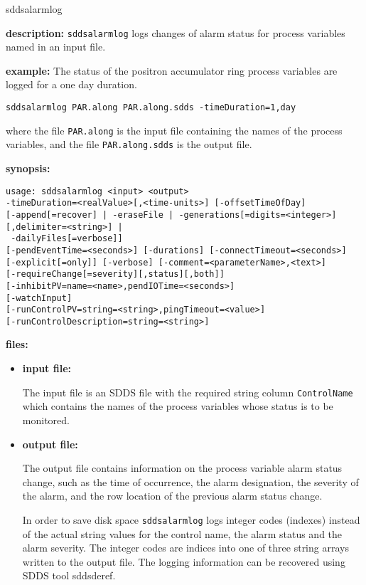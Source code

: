 \begin{sddsprog}{sddsalarmlog}
\item {\bf description:}
\verb+sddsalarmlog+ logs changes of alarm status for process variables named in an input file.
\item {\bf example:} 
% 
The status of the positron accumulator ring process variables are logged
for a one day duration.
\begin{verbatim}
sddsalarmlog PAR.along PAR.along.sdds -timeDuration=1,day
\end{verbatim}
where the file \verb+PAR.along+ is the input file containing the names of the
process variables, and the file \verb+PAR.along.sdds+ is the output file.

\item {\bf synopsis:} 
\begin{verbatim}
usage: sddsalarmlog <input> <output>
-timeDuration=<realValue>[,<time-units>] [-offsetTimeOfDay]
[-append[=recover] | -eraseFile | -generations[=digits=<integer>][,delimiter=<string>] |
 -dailyFiles[=verbose]]
[-pendEventTime=<seconds>] [-durations] [-connectTimeout=<seconds>]
[-explicit[=only]] [-verbose] [-comment=<parameterName>,<text>]
[-requireChange[=severity][,status][,both]]
[-inhibitPV=name=<name>,pendIOTime=<seconds>]
[-watchInput]
[-runControlPV=string=<string>,pingTimeout=<value>]
[-runControlDescription=string=<string>]
\end{verbatim}

\item {\bf files:}
\begin{itemize}
\item {\bf input file:}\par
The input file is an SDDS file with the required string column {\tt ControlName}
which contains the names of the process variables whose status is to be monitored.

\item {\bf output file:}\par
The output file contains information on the process variable alarm status
change, such as the time of occurrence, the alarm designation, the severity of the alarm, and the
row location of the previous alarm status change.

In order to save disk space {\tt sddsalarmlog} logs integer codes
(indexes) instead of the actual string values for the control name,
the alarm status and the alarm severity. The integer codes are indices
into one of three string arrays written to the output file. The logging information
can be recovered using SDDS tool sddsderef. 


\end{itemize}
\end{sddsprog}
